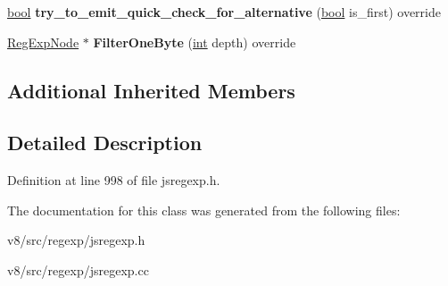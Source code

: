 \begin{DoxyCompactItemize}
\mbox{\hyperlink{classbool}{bool}} {\bfseries try\+\_\+to\+\_\+emit\+\_\+quick\+\_\+check\+\_\+for\+\_\+alternative} (\mbox{\hyperlink{classbool}{bool}} is\+\_\+first) override
\item 
\mbox{\label{classv8_1_1internal_1_1NegativeLookaroundChoiceNode_ad0cf8e0ac118e6be88ff0cb680122fff}} 
\mbox{\hyperlink{classv8_1_1internal_1_1RegExpNode}{Reg\+Exp\+Node}} $\ast$ {\bfseries Filter\+One\+Byte} (\mbox{\hyperlink{classint}{int}} depth) override
\end{DoxyCompactItemize}
\subsection*{Additional Inherited Members}


\subsection{Detailed Description}


Definition at line 998 of file jsregexp.\+h.



The documentation for this class was generated from the following files\+:\begin{DoxyCompactItemize}
\item 
v8/src/regexp/jsregexp.\+h\item 
v8/src/regexp/jsregexp.\+cc\end{DoxyCompactItemize}
